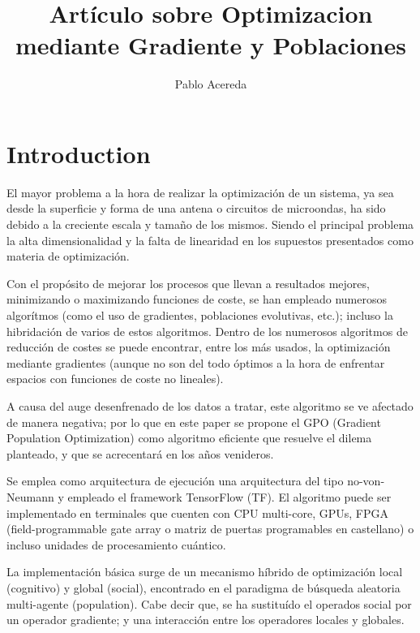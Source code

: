 \documentclass{article}
\author{Pablo Acereda}
\title{Artículo sobre Optimizacion mediante Gradiente y Poblaciones}
\begin{document}
\maketitle

\section{Introduction}

El mayor problema a la hora de realizar la optimización de un sistema, ya sea
desde la superficie y forma de una antena o circuitos de microondas, ha sido 
debido a la creciente escala y tamaño de los mismos. Siendo el principal
problema la alta dimensionalidad y la falta de linearidad en los supuestos
presentados como materia de optimización.

Con el propósito de mejorar los procesos que llevan a resultados mejores,
minimizando o maximizando funciones de coste, se han empleado numerosos
algorítmos (como el uso de gradientes, poblaciones evolutivas, etc.); incluso 
la hibridación de varios de estos algoritmos. Dentro de los numerosos 
algoritmos de reducción de costes se puede encontrar, entre los más usados, 
la optimización mediante gradientes (aunque no son del todo óptimos a la 
hora de enfrentar espacios con funciones de coste no lineales).


A causa del auge desenfrenado de los datos a tratar, este algoritmo se ve
afectado de manera negativa; por lo que en este paper se propone el GPO
(Gradient Population Optimization) como algoritmo eficiente que resuelve el
dilema planteado, y que se acrecentará en los años venideros.


Se emplea como arquitectura de ejecución una arquitectura del tipo 
no-von-Neumann y empleado el framework TensorFlow (TF). El algoritmo puede ser
implementado en terminales que cuenten con CPU multi-core, GPUs, FPGA
(field-programmable gate array o matriz de puertas programables en castellano) o
incluso unidades de procesamiento cuántico.

La implementación básica surge de un mecanismo híbrido de optimización local
(cognitivo) y global (social), encontrado en el paradigma de búsqueda aleatoria 
multi-agente (population). Cabe decir que, se ha sustituído el operados social
por un operador gradiente; y una interacción entre los operadores locales y
globales.
\end{document}
